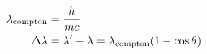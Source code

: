 

\vspace*{\fill}
\centering

\begin{align*}
    \lambda_{\rm compton} &= \frac{h}{mc} \\
    \Delta \lambda &= \lambda' - \lambda = \lambda_{\rm compton}(1 - \cos{\theta})
\end{align*}

\centering
\vspace*{\fill}

